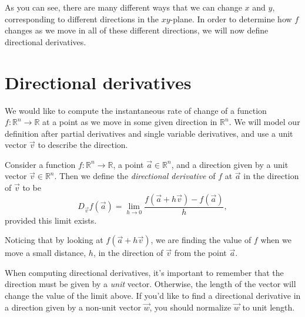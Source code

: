 \documentclass{ximera}
\begin{document}
As you can see, there are many different ways that we can change $x$ and $y$, corresponding to different directions in the $xy$-plane. In order to determine how $f$ changes as we move in all of these different directions, we will now define directional derivatives.

\section*{Directional derivatives}

We would like to compute the instantaneous rate of change of a function $f:\mathbb{R}^n\rightarrow\mathbb{R}$ at a point as we move in some given direction in $\mathbb{R}^n$. We will model our definition after partial derivatives and single variable derivatives, and use a unit vector $\vec{v}$ to describe the direction.

\begin{definition}
Consider a function $f:\mathbb{R}^n\rightarrow\mathbb{R}$, a point $\vec{a}\in\mathbb{R}^n$, and a direction given by a unit vector $\vec{v}\in\mathbb{R}^n$. Then we define the \emph{directional derivative} of $f$ at $\vec{a}$ in the direction of $\vec{v}$ to be
\[
D_{\vec{v}}f(\vec{a}) = \lim_{h\rightarrow 0}\frac{f(\vec{a}+h\vec{v})-f(\vec{a})}{h},
\]
provided this limit exists.
\end{definition}

Noticing that by looking at $f(\vec{a}+h\vec{v})$, we are finding the value of $f$ when we move a small distance, $h$, in the direction of $\vec{v}$ from the point $\vec{a}$.

\begin{image}
\end{image}

When computing directional derivatives, it's important to remember that the direction must be given by a \emph{unit} vector. Otherwise, the length of the vector will change the value of the limit above. If you'd like to find a directional derivative in a direction given by a non-unit vector $\vec{w}$, you should normalize $\vec{w}$ to unit length.
\end{document}
